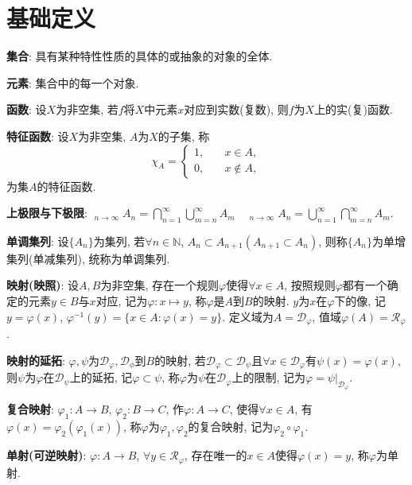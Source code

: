 \documentclass[12pt, a4paper, oneside]{ctexart}
\DeclareMathOperator*\uplim{\overline{lim}} %
\DeclareMathOperator*\lowlim{\underline{lim}} %
\def\N{\mathbb{N}}          %
\begin{document}

\section*{基础定义}
\textbf{集合}: 具有某种特性性质的具体的或抽象的对象的全体.

\textbf{元素}: 集合中的每一个对象.

\textbf{函数}: 设$X$为非空集, 若$f$将$X$中元素$x$对应到实数(复数), 则$f$为$X$上的实(复)函数.

\textbf{特征函数}: 设$X$为非空集, $A$为$X$的子集, 称
\begin{equation*}
    \chi_A=\begin{cases}
        1,&\quad x\in A,\\
        0,&\quad x\notin A,
    \end{cases}
\end{equation*}
为集$A$的特征函数.

\textbf{上极限与下极限}: $\uplim_{n\to\infty}A_n = \bigcap_{n=1}^\infty\bigcup_{m=n}^\infty A_m\quad \lowlim_{n\to\infty}A_n=\bigcup_{n=1}^\infty\bigcap_{m=n}^\infty A_m$.

\textbf{单调集列}: 设$\{A_n\}$为集列, 若$\forall n\in \N$, $A_n\subset A_{n+1}(A_{n+1}\subset A_n)$, 则称$\{A_n\}$为单增集列(单减集列), 统称为单调集列.

\textbf{映射(映照)}: 设$A, B$为非空集, 存在一个规则$\varphi$使得$\forall x\in A$, 按照规则$\varphi$都有一个确定的元素$y\in B$与$x$对应, 记为$\varphi:x\mapsto y$, 称$\varphi$是$A$到$B$的映射. $y$为$x$在$\varphi$下的像, 记$y = \varphi(x)$, $\varphi^{-1}(y) = \{x\in A: \varphi(x) = y\}$. 定义域为$A = \mathcal{D}_\varphi$, 值域$\varphi(A) = \mathcal{R}_\varphi$.

\textbf{映射的延拓}: $\varphi,\psi$为$\mathcal{D}_\varphi, \mathcal{D}_\phi$到$B$的映射, 若$\mathcal{D}_\varphi\subset \mathcal{D}_\psi$且$\forall x\in \mathcal{D}_\varphi$有$\psi(x)=\varphi(x)$, 则$\psi$为$\varphi$在$\mathcal{D}_\psi$上的延拓, 记$\varphi\subset\psi$, 称$\varphi$为$\psi$在$\mathcal{D}_\varphi$上的限制, 记为$\varphi = \psi|_{\mathcal{D}_\varphi}$.

\textbf{复合映射}: $\varphi_1:A\to B$, $\varphi_2:B\to C$, 作$\varphi:A\to C$, 使得$\forall x\in A$, 有$\varphi(x) = \varphi_2(\varphi_1(x))$, 称$\varphi$为$\varphi_1,\varphi_2$的复合映射, 记为$\varphi_2\circ\varphi_1$.

\textbf{单射(可逆映射)}: $\varphi:A\to B$, $\forall y\in \mathcal{R}_\varphi$, 存在唯一的$x\in A$使得$\varphi(x) = y$, 称$\varphi$为单射.
\end{document}
